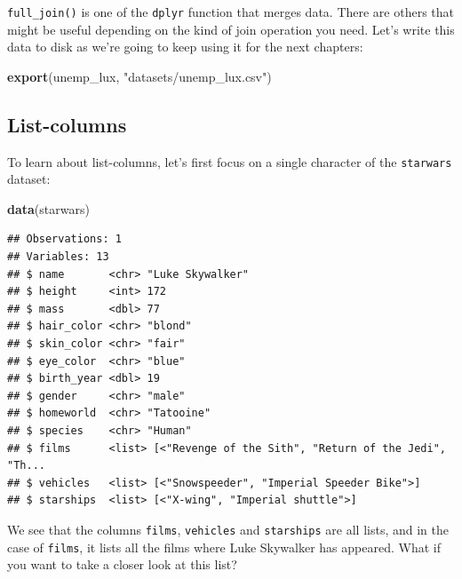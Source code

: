 \documentclass[]{gitbook}
\newenvironment{Shaded}{\begin{snugshade}}{\end{snugshade}}
\newcommand{\KeywordTok}[1]{\textcolor[rgb]{0.13,0.29,0.53}{\textbf{#1}}}
\newcommand{\NormalTok}[1]{#1}
\newcommand{\OperatorTok}[1]{\textcolor[rgb]{0.81,0.36,0.00}{\textbf{#1}}}
\newcommand{\StringTok}[1]{\textcolor[rgb]{0.31,0.60,0.02}{#1}}
\theoremstyle{definition}
\theoremstyle{definition}
\theoremstyle{definition}
\theoremstyle{remark}
\begin{document}
\texttt{full\_join()} is one of the \texttt{dplyr} function that merges
data. There are others that might be useful depending on the kind of
join operation you need. Let's write this data to disk as we're going to
keep using it for the next chapters:

\begin{Shaded}
\begin{Highlighting}[]
\KeywordTok{export}\NormalTok{(unemp_lux, }\StringTok{"datasets/unemp_lux.csv"}\NormalTok{)}
\end{Highlighting}
\end{Shaded}

\hypertarget{list-columns}{%
\subsection{List-columns}\label{list-columns}}

To learn about list-columns, let's first focus on a single character of
the \texttt{starwars} dataset:

\begin{Shaded}
\begin{Highlighting}[]
\KeywordTok{data}\NormalTok{(starwars)}
\end{Highlighting}
\end{Shaded}

\begin{Shaded}
\end{Shaded}

\begin{verbatim}
## Observations: 1
## Variables: 13
## $ name       <chr> "Luke Skywalker"
## $ height     <int> 172
## $ mass       <dbl> 77
## $ hair_color <chr> "blond"
## $ skin_color <chr> "fair"
## $ eye_color  <chr> "blue"
## $ birth_year <dbl> 19
## $ gender     <chr> "male"
## $ homeworld  <chr> "Tatooine"
## $ species    <chr> "Human"
## $ films      <list> [<"Revenge of the Sith", "Return of the Jedi", "Th...
## $ vehicles   <list> [<"Snowspeeder", "Imperial Speeder Bike">]
## $ starships  <list> [<"X-wing", "Imperial shuttle">]
\end{verbatim}

We see that the columns \texttt{films}, \texttt{vehicles} and
\texttt{starships} are all lists, and in the case of \texttt{films}, it
lists all the films where Luke Skywalker has appeared. What if you want
to take a closer look at this list?
\end{document}

